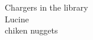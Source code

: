 \documentclass[preview]{standalone}
\begin{document}
Chargers in the library\\Lucine\\chiken nuggets\\
\end{document}
